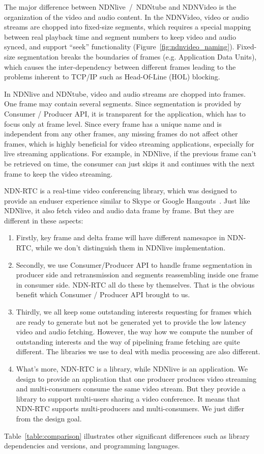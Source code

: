 The major difference between NDNlive~/~NDNtube and NDNVideo is the organization of the video and audio content. In the NDNVideo, video or audio streams are chopped into fixed-size segments, which requires a special mapping between real playback time and segment numbers to keep video and audio synced, and support ``seek'' functionality (Figure~\ref{fig:ndnvideo_naming}). Fixed-size segmentation breaks the boundaries of frames (e.g. Application Data Units), which causes the inter-dependency between different frames leading to the problems inherent to TCP/IP such as Head-Of-Line (HOL) blocking.

In NDNlive and NDNtube, video and audio streams are chopped into frames. One frame may contain several segments. Since segmentation is provided by Consumer / Producer API, it is transparent for the application, which has to focus only at frame level. Since every frame has a unique name and is independent from any other frames, any missing frames do not affect other frames, which is highly beneficial for video streaming applications, especially for live streaming applications. For example, in NDNlive, if the previous frame can't be retrieved on time, the consumer can just skips it and continues with the next frame to keep the video streaming. 

NDN-RTC is a real-time video conferencing library, which was designed to provide an enduser experience similar to Skype or Google Hangouts~\cite{ndn-rtc}. Just like NDNlive, it also fetch video and audio data frame by frame. But they are different in these aspects:
\begin{enumerate}
	\item Firstly, key frame and delta frame will have different namesapce in NDN-RTC, while we don't distinguish them in NDNlive implementation. 

	\item Secondly, we use Consumer/Producer API to handle frame segmentation in producer side and retransmission and segments reassembling inside one frame in consumer side. NDN-RTC all do these by themselves. That is the obvious benefit which Consumer / Producer API brought to us. 

	\item Thirdly, we all keep some outstanding interests requesting for frames which are ready to generate but not be generated yet to provide the low latency video and audio fetching. However, the way how we compute the number of outstanding interests and the way of pipelining frame fetching are quite different. The libraries we use to deal with media processing are also different. 

	\item What's more, NDN-RTC is a library, while NDNlive is an application. We design to provide an application that one producer produces video streaming and multi-consumers consume the same video stream. But they provide a library to support multi-users sharing a video conference. It means that NDN-RTC supports multi-producers and multi-consumers. We just differ from the design goal.
\end{enumerate}
Table~\ref{table:comparison} illustrates other significant differences such as library dependencies and versions, and programming languages.


